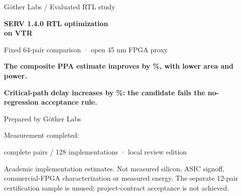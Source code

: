 


\thispagestyle{empty}
\vspace*{43mm}
{\color{Mid}\fontsize{11}{14}\selectfont Göther Labs / Evaluated RTL study}\par
\vspace{5mm}
{\color{Ink}\fontsize{29}{33}\selectfont\bfseries SERV 1.4.0 RTL optimization\\on VTR}\par
\vspace{5mm}
{\color{Mid}\fontsize{13}{16}\selectfont Fixed 64-pair comparison · open 45 nm FPGA proxy}\par
\vspace{17mm}
\begin{claimbox}
{\fontsize{15}{19}\selectfont\bfseries The composite PPA estimate improves by \CompositeImprovement\%, with lower area and power.}\par
\vspace{3mm}
{\color{Regress}\fontsize{14}{18}\selectfont\bfseries Critical-path delay increases by \DelayIncrease\%: the candidate fails the no-regression acceptance rule.}
\end{claimbox}
\vspace{23mm}
{\color{Mid}\fontsize{12}{15}\selectfont Prepared by Göther Labs}\par
\vspace{4mm}
{\color{Mid}\fontsize{12}{15}\selectfont Measurement completed: \EvidenceDate}\par
\vspace{4mm}
{\color{Mid}\fontsize{11}{14} complete pairs / 128 implementations · local review edition}\par
\vfill
{\color{Mid}\footnotesize Academic implementation estimates. Not measured silicon, ASIC signoff, commercial-FPGA characterization or measured energy. The separate 12-pair certification sample is unused; project-contract acceptance is not achieved.}\par

